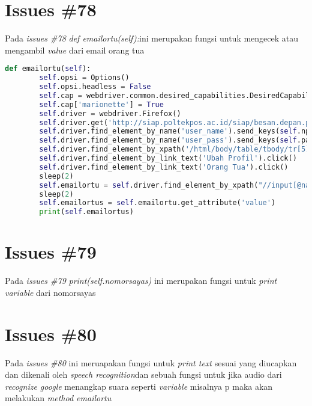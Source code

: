 \section{Issues \#78}
Pada \textit{issues \#78} \textit{def emailortu(self):}ini merupakan fungsi untuk mengecek atau mengambil \textit{value} dari email orang tua
\begin{lstlisting}[language=Python]
 def emailortu(self):
        self.opsi = Options()
        self.opsi.headless = False
        self.cap = webdriver.common.desired_capabilities.DesiredCapabilities().FIREFOX
        self.cap['marionette'] = True
        self.driver = webdriver.Firefox()
        self.driver.get('http://siap.poltekpos.ac.id/siap/besan.depan.php')
        self.driver.find_element_by_name('user_name').send_keys(self.npm)
        self.driver.find_element_by_name('user_pass').send_keys(self.paswd)
        self.driver.find_element_by_xpath('/html/body/table/tbody/tr[5]/td/table[1]/tbody/tr/td[2]/table[2]/tbody/tr[1]/td[2]/div/form/input[4]').click()
        self.driver.find_element_by_link_text('Ubah Profil').click()
        self.driver.find_element_by_link_text('Orang Tua').click()
        sleep(2)
        self.emailortu = self.driver.find_element_by_xpath("//input[@name='EmailOrtu']")
        sleep(2)
        self.emailortus = self.emailortu.get_attribute('value')
        print(self.emailortus)
\end{lstlisting}


\section{Issues \#79}
Pada \textit{issues \#79} \textit{print(self.nomorsayas)} ini merupakan fungsi untuk \textit{print variable} dari nomorsayas

\section{Issues \#80}
Pada \textit{issues \#80} ini meruapakan fungsi untuk \textit{print text} sesuai yang diucapkan dan dikenali oleh \textit{speech recognition}dan sebuah fungsi untuk jika audio dari \textit{recognize google} menangkap suara seperti \textit{variable} misalnya p maka akan melakukan \textit{method emailortu}